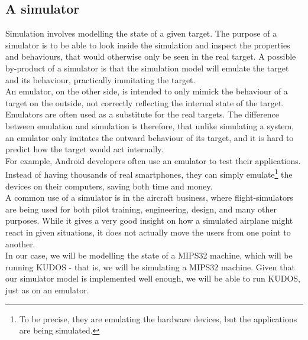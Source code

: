 \subsection{A simulator}
Simulation involves modelling the state of a given target.  The purpose of a
simulator is to be able to look inside the simulation and inspect the properties
and behaviours, that would otherwise only be seen in the real target.
A possible by-product of a simulator is that the simulation model will emulate
the target and its behaviour, practically immitating the target.\\
An emulator, on the other side, is intended to only mimick the behaviour of
a target on the outside, not correctly reflecting the internal state of the target.
Emulators are often used as a substitute for the real targets.
The difference between emulation and simulation is therefore, that unlike simulating a system,
an emulator only imitates the outward behaviour of its target, and it is hard
to predict how the target would act internally.\\
For example, Android developers often use an emulator to test their applications.
Instead of having thousands of real smartphones, they can simply emulate\footnote{
To be precise, they are emulating the hardware devices, but the applications are being simulated.}
the devices on their computers, saving both time and money.\\
A common use of a simulator is in the aircraft business, where flight-simulators
are being used for both pilot training, engineering, design, and many other
purposes. While it gives a very good insight on how a simulated airplane might
react in given situations, it does not actually move the users from one point
to another.\\
In our case, we will be modelling the state of a MIPS32 machine, which will be
running KUDOS - that is, we will be simulating a MIPS32 machine. Given that our
simulator model is implemented well enough, we will be able to run KUDOS, just as
on an emulator.\\


